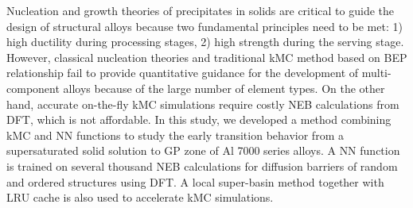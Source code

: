 Nucleation and growth theories of precipitates in solids are critical to guide the design of structural alloys because two fundamental principles need to be met: 1) high ductility during processing stages, 2) high strength during the serving stage. However, classical nucleation theories and traditional \ac{kMC} method based on \acf{BEP} relationship fail to provide quantitative guidance for the development of multi-component alloys because of the large number of element types. On the other hand, accurate on-the-fly \ac{kMC} simulations require costly \ac{NEB} calculations from \ac{DFT}, which is not affordable. In this study, we developed a method combining \ac{kMC} and \ac{NN} functions to study the early transition behavior from a supersaturated solid solution to \ac{GP} zone of Al 7000 series alloys. A \ac{NN} function is trained on several thousand \ac{NEB} calculations for diffusion barriers of random and ordered structures using \ac{DFT}. A local super-basin method together with \ac{LRU} cache is also used to accelerate \ac{kMC} simulations.





